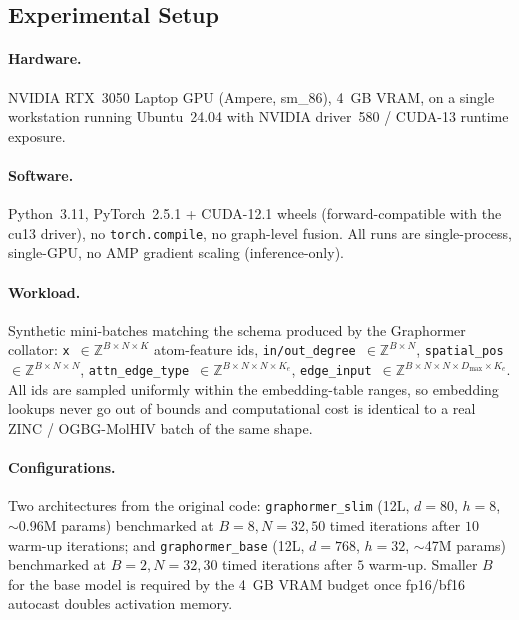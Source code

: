 \documentclass[11pt]{article}
\begin{document}
\subsection{Experimental Setup}

\paragraph{Hardware.} NVIDIA RTX~3050 Laptop GPU (Ampere, sm\_86), 4~GB
VRAM, on a single workstation running Ubuntu~24.04 with NVIDIA
driver~580 / CUDA-13 runtime exposure.

\paragraph{Software.} Python~3.11, PyTorch~2.5.1 + CUDA-12.1 wheels
(forward-compatible with the cu13 driver), no \texttt{torch.compile}, no
graph-level fusion. All runs are single-process, single-GPU, no AMP
gradient scaling (inference-only).

\paragraph{Workload.} Synthetic mini-batches matching the schema
produced by the Graphormer collator: \texttt{x}~$\in\!\mathbb{Z}^{B \times N \times K}$
atom-feature ids, \texttt{in/out\_degree}~$\in\!\mathbb{Z}^{B \times N}$,
\texttt{spatial\_pos}~$\in\!\mathbb{Z}^{B \times N \times N}$,
\texttt{attn\_edge\_type}~$\in\!\mathbb{Z}^{B \times N \times N \times K_e}$,
\texttt{edge\_input}~$\in\!\mathbb{Z}^{B \times N \times N \times D_{\text{max}} \times K_e}$.
All ids are sampled uniformly within the embedding-table ranges, so
embedding lookups never go out of bounds and computational cost is
identical to a real ZINC / OGBG-MolHIV batch of the same shape.

\paragraph{Configurations.} Two architectures from the original code:
\texttt{graphormer\_slim} (12L, $d{=}80$, $h{=}8$, $\sim$0.96M params)
benchmarked at $B{=}8, N{=}32, 50$ timed iterations after $10$ warm-up
iterations; and \texttt{graphormer\_base} (12L, $d{=}768$, $h{=}32$,
$\sim$47M params) benchmarked at $B{=}2, N{=}32, 30$ timed iterations
after $5$ warm-up. Smaller $B$ for the base model is required by the
4~GB VRAM budget once fp16/bf16 autocast doubles activation memory.
\end{document}
